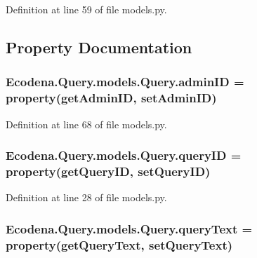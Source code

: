 Definition at line 59 of file models.py.



\subsection{Property Documentation}
\hypertarget{class_ecodena_1_1_query_1_1models_1_1_query_a7397d58744f73dd037d7928ca7bb5593}{
\subsubsection[{adminID}]{\setlength{\rightskip}{0pt plus 5cm}Ecodena.Query.models.Query.adminID = property(getAdminID, setAdminID)}}
\label{de/d81/class_ecodena_1_1_query_1_1models_1_1_query_a7397d58744f73dd037d7928ca7bb5593}


Definition at line 68 of file models.py.

\hypertarget{class_ecodena_1_1_query_1_1models_1_1_query_a44a48f0e111c10ab2206c5dc44ca89af}{
\subsubsection[{queryID}]{\setlength{\rightskip}{0pt plus 5cm}Ecodena.Query.models.Query.queryID = property(getQueryID, setQueryID)}}
\label{de/d81/class_ecodena_1_1_query_1_1models_1_1_query_a44a48f0e111c10ab2206c5dc44ca89af}


Definition at line 28 of file models.py.

\hypertarget{class_ecodena_1_1_query_1_1models_1_1_query_a8c5d0779f4cfbe980fae5278a9837d69}{
\subsubsection[{queryText}]{\setlength{\rightskip}{0pt plus 5cm}Ecodena.Query.models.Query.queryText = property(getQueryText, setQueryText)}}
\label{de/d81/class_ecodena_1_1_query_1_1models_1_1_query_a8c5d0779f4cfbe980fae5278a9837d69}


